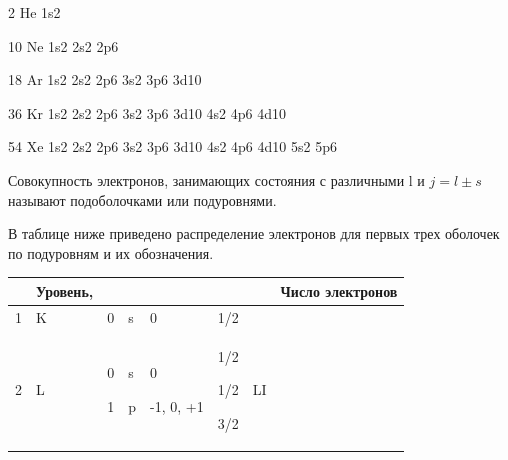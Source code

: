 \documentclass[a4paper,14pt, openany, twoside, draft]{extbook} %
\begin{document}
 2 He  1s2

10 Ne  1s2  2s2  2p6

18 Ar  1s2  2s2  2p6  3s2  3p6  3d10

36 Kr  1s2  2s2  2p6  3s2  3p6  3d10  4s2 4p6  4d10

54 Xe  1s2  2s2  2p6  3s2  3p6  3d10  4s2 4p6  4d10  5s2  5p6

Совокупность электронов, занимающих состояния с различными l и   $j=l\pm s$ называют подоболочками или подуровнями.

В таблице ниже приведено распределение электронов для первых трех оболочек по подуровням и их обозначения.

\begin{flushleft}
\tablefirsthead{}
\tablehead{}
\tabletail{}
\tablelasttail{}
\begin{supertabular}{|m{0.7cm}|m{1.9449999cm}|m{0.68cm}|m{1.726cm}|m{2.892cm}|m{1.04cm}|m{1.8499999cm}|m{2.504cm}|}
\hline
{} &
{\centering{} Уровень,\par}

 &
 &
 &
 &
 &
 &
{\centering{} Число электронов\par}

{}\\\hline
{ 1} &
{ K} &
{ 0} &
{ s} &
{ 0} &
{ 1/2 } &
{} &
{}\\\hline
{ 2} &
{ L} &
{ 0}

{ 1} &
{ s}

{ p} &
{ 0}

{ {}-1, 0, +1} &
{ 1/2 }

{ 1/2}

{ 3/2 } &
{\centering{} LI\par}


\end{supertabular}
\end{flushleft}
\end{document}
